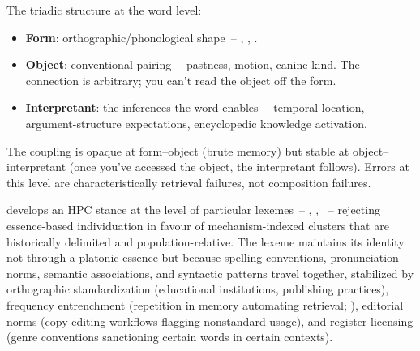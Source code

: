 The triadic structure at the word level:

\begin{itemize}
    \item \textbf{Form}: orthographic/phonological shape~-- , , .
    \item \textbf{Object}: conventional pairing~-- pastness, motion, canine-kind. The connection is arbitrary; you can't read the object off the form.
    \item \textbf{Interpretant}: the inferences the word enables~-- temporal location, argument-structure expectations, encyclopedic knowledge activation.
\end{itemize}

The coupling is opaque at form--object (brute memory) but stable at object--interpretant (once you've accessed the object, the interpretant follows). Errors at this level are characteristically retrieval failures, not composition failures.

\textcite{miller2021} develops an HPC stance at the level of particular lexemes~-- , , ~-- rejecting essence-based individuation in favour of mechanism-indexed clusters that are historically delimited and population-relative. The lexeme  maintains its identity not through a platonic essence but because spelling conventions, pronunciation norms, semantic associations, and syntactic patterns travel together, stabilized by orthographic standardization (educational institutions, publishing practices), frequency entrenchment (repetition in memory automating retrieval; \citealt{bybee2001}), editorial norms (copy-editing workflows flagging nonstandard usage), and register licensing (genre conventions sanctioning certain words in certain contexts).

